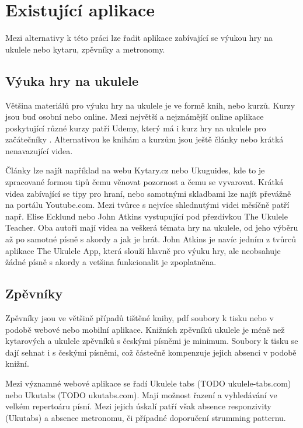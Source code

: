 \section{Existující aplikace}
\label{sc:existing_apps}
Mezi alternativy k této práci lze řadit aplikace zabívající se výukou hry na ukulele nebo kytaru, zpěvníky a metronomy.

\subsection{Výuka hry na ukulele}
\label{ss:existing_teaching_apps}
Většina materiálů pro výuku hry na ukulele je ve formě knih, nebo kurzů.
Kurzy jsou buď osobní nebo online. Mezi největší a nejznámější online aplikace poskytující různé kurzy patří Udemy, který má i kurz hry na ukulele pro začátečníky \cite{puchmayr_complete}. Alternativou ke knihám a kurzům jsou ještě články nebo krátká nenavazující videa.

Články lze najít například na webu Kytary.cz nebo Ukuguides, kde to je zpracované formou tipů čemu věnovat pozornost a čemu se vyvarovat. Krátká videa zabívající se tipy pro hraní, nebo samotnými skladbami lze najít převážně na portálu Youtube.com. Mezi tvůrce s nejvíce shlednutými videi měsíčně patří např. Elise Ecklund nebo John Atkins vystupující pod přezdívkou The Ukulele Teacher. Oba autoři mají videa na veškerá témata hry na ukulele, od jeho výběru až po samotné písně s akordy a jak je hrát. John Atkins je navíc jedním z tvůrců aplikace The Ukulele App, která slouží hlavně pro výuku hry, ale neobsahuje žádné písně s akordy a vetšina funkcionalit je zpoplatněna.

\subsection{Zpěvníky}
\label{ss:songbooks}
Zpěvníky jsou ve většině případů tištěné knihy, pdf soubory k tisku nebo v podobě webové nebo mobilní aplikace. Knižních zpěvníků ukulele je méně než kytarových a ukulele zpěvníků s českými písněmi je minimum. Soubory k tisku se dají sehnat i s českými písněmi, což částečně kompenzuje jejich absenci v podobě knižní.

Mezi významné webové aplikace se řadí Ukulele tabs (TODO ukulele-tabs.com) nebo Ukutabs (TODO ukutabs.com). Mají možnost řazení a vyhledávání ve velkém repertoáru písní. Mezi jejich úskalí patří však absence responzivity (Ukutabs) a absence metronomu, či případné doporučení strumming patternu.

